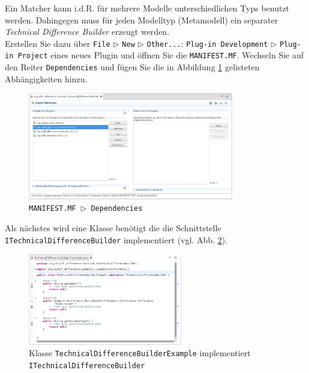 \documentclass[a4paper]{scrartcl}
\begin{document}
Ein Matcher kann i.d.R. für mehrere Modelle unterschiedlichen Typs benutzt werden. Dahingegen muss für jeden Modelltyp (Metamodell) ein separater \textit{Technical Difference Builder} erzeugt werden.\\
Erstellen Sie dazu über \texttt{File} $\triangleright$ \texttt{New} $\triangleright$ \texttt{Other...}: \texttt{Plug-in Development} $\triangleright$ \texttt{Plug-in Project} eines neues Plugin und öffnen Sie die \texttt{MANIFEST.MF}.
Wechseln Sie auf den Reiter \texttt{Dependencies} und fügen Sie die in Abbildung \ref{silift-plugin_techbuilder_manifest_dependencies} gelisteten Abhängigkeiten hinzu.

\begin{figure}[H]
\centering
\includegraphics[width=0.8\textwidth]{graphics/silift-plugin_techbuilder_manifest_dependencies.png}
\caption{\texttt{\texttt{MANIFEST.MF} $\triangleright$ \texttt{Dependencies}}}
\label{silift-plugin_techbuilder_manifest_dependencies}
\end{figure}

Als nächstes wird eine Klasse benötigt die die Schnittstelle \texttt{ITechnicalDifferenceBuilder} implementiert (vgl. Abb. \ref{silift-plugin_techbuilder_itechbuilder}).

\begin{figure}[H]
\centering
\includegraphics[width=0.6\textwidth]{graphics/silift-plugin_techbuilder_itechbuilder.png}
\caption{Klasse \texttt{TechnicalDifferenceBuilderExample} implementiert \texttt{ITechnicalDifferenceBuilder}}
\label{silift-plugin_techbuilder_itechbuilder}
\end{figure}
\end{document}
